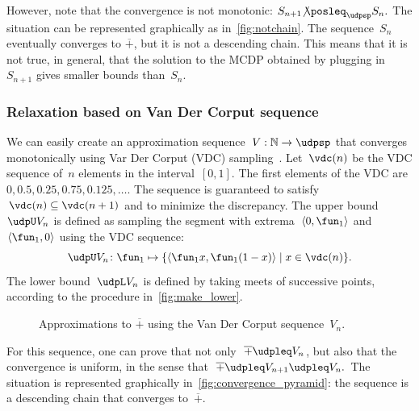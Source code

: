 However, note that the convergence is not monotonic: $S_{n+1}{\not\posleq}_{\udpsp}S_{n}.$
The situation can be represented graphically as in~\cref{fig:notchain}.
The sequence~$S_{n}$ eventually converges to $\overline{+}$, but
it is not a descending chain. This means that it is not true, in general,
that the solution to the MCDP obtained by plugging in~$S_{n+1}$
gives smaller bounds than~$S_{n}$.

\subsubsection*{Relaxation based on Van Der Corput sequence}

We can easily create an approximation sequence~$V:\mathbb{N}\rightarrow\udpsp$
that converges monotonically using Var Der Corput (VDC) sampling~\cite[Section 5.2]{LaValle2006Planning}.
Let~$\vdc(n)$ be the VDC sequence of~$n$ elements in the interval~$[0,1]$.
The first elements of the VDC are $0,0.5,0.25,0.75,0.125,\dots$.
The sequence is guaranteed to satisfy~$\vdc(n)\subseteq\vdc(n+1)$
and to minimize the discrepancy. The upper bound~$\udpU V_{n}$
is defined as sampling the segment with extrema~$\left\langle 0,\fun_{1}\right\rangle $
and~$\left\langle \fun_{1},0\right\rangle $ using the VDC sequence:
\[
  \udpU V_{n}\colon\fun_{1}\mapsto\{\left\langle \fun_{1}x,\fun_{1}(1-x)\right\rangle \mid x\in\vdc(n)\}.
\]
The lower bound~$\udpL V_{n}$ is defined by taking meets of successive
points, according to the procedure in~\cref{fig:make_lower}.
\begin{center}
  \begin{figure}[h]
    \begin{centering}
      \par
    \end{centering}
    \caption{\label{fig:Vn}Approximations to $\overline{+}$ using the Van Der
    Corput sequence~$V_{n}$.}
  \end{figure}
  \par
\end{center}

For this sequence, one can prove that not only~$\overline{+}\udpleq V_{n}$,
but also that the convergence is uniform, in the sense that~$\overline{+}\udpleq V_{n+1}\udpleq V_{n}.$
The situation is represented graphically in~\cref{fig:convergence_pyramid}:
the sequence is a descending chain that converges to~$\overline{+}$.

